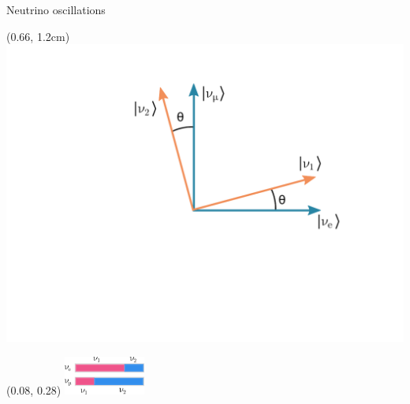 \documentclass{beamer}
\begin{document}
\begin{frame}{Neutrino oscillations}
	\begin{textblock*}{0.6\textwidth}(0.66\textwidth, 1.2cm)
		\includegraphics[width=\textwidth]{bases.pdf}
	\end{textblock*}
	
	\begin{textblock*}{\textwidth}(0.08\textwidth, 0.28\textwidth)
		\includegraphics[width=0.2\textwidth]{eigenstates.pdf}
	\end{textblock*}

	\vspace{0.5cm}
\end{frame}
\end{document}
